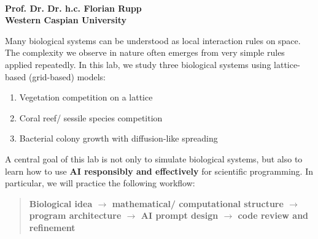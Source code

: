 \documentclass[paper=letter, fontsize=12pt]{article}
\numberwithin{equation}{section}
\begin{document}
\thispagestyle{fancy} %

\begin{center}
\\[7mm]
\end{center}

\begin{center}
{\fontsize{14pt}{10pt}\selectfont\textbf{Prof. Dr. Dr. h.c. Florian Rupp \\[2mm]
Western Caspian University}}
\end{center}

%

\vspace*{0.7cm}

\noindent Many biological systems can be understood as local interaction rules on space. The complexity we observe in nature often emerges from very simple rules applied repeatedly. In this lab, we study three biological systems using lattice-based (grid-based) models:
\begin{enumerate}
\item Vegetation competition on a lattice
\item Coral reef/ sessile species competition
\item Bacterial colony growth with diffusion-like spreading
\end{enumerate}

A central goal of this lab is not only to simulate biological systems, but also to learn how to use \textbf{AI responsibly and effectively} for scientific programming. In particular, we will practice the following workflow:
\begin{quote}
\textbf{Biological idea $\rightarrow$ mathematical/ computational structure $\rightarrow$ program architecture $\rightarrow$ AI prompt design $\rightarrow$ code review and refinement}
\end{quote}
\end{document}
